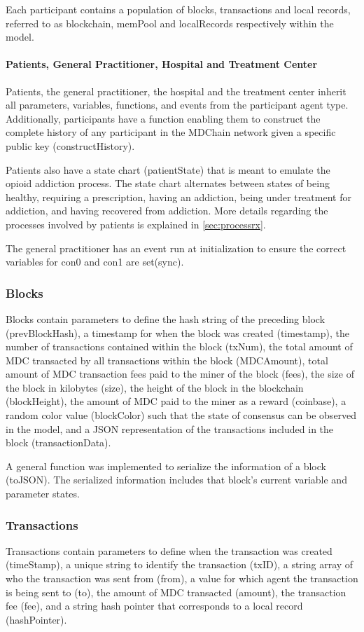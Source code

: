 \documentclass[12pt]{report}
\begin{document}
Each participant contains a population of blocks, transactions and local records, referred to as blockchain, memPool and localRecords respectively within the model.

\paragraph{Patients, General Practitioner, Hospital and Treatment Center}
Patients, the general practitioner, the hospital and the treatment center inherit all parameters, variables, functions, and events from the participant agent type. Additionally, participants have a function enabling them to construct the complete history of any participant in the MDChain network given a specific public key (constructHistory).

Patients also have a state chart (patientState) that is meant to emulate the opioid addiction process. The state chart alternates between states of being healthy, requiring a prescription, having an addiction, being under treatment for addiction, and having recovered from addiction. More details regarding the processes involved by patients is explained in \autoref{sec:processrx}.

The general practitioner has an event run at initialization to ensure the correct variables for con0 and con1 are set(sync).
\subsubsection{Blocks}
Blocks contain parameters to define the hash string of the preceding block (prevBlockHash), a timestamp for when the block was created (timestamp), the number of transactions contained within the block (txNum), the total amount of MDC transacted by all transactions within the block (MDCAmount), total amount of MDC transaction fees paid to the miner of the block (fees), the size of the block in kilobytes (size), the height of the block in the blockchain (blockHeight), the amount of MDC paid to the miner as a reward (coinbase), a random color value (blockColor) such that the state of consensus can be observed in the model, and a JSON representation of the transactions included in the block (transactionData). 

A general function was implemented to serialize the  information of a block (toJSON). The serialized information includes that block's current variable and parameter states.

\subsubsection{Transactions}
Transactions contain parameters to define when the transaction was created (timeStamp), a unique string to identify the transaction (txID), a string array of who the transaction was sent from (from), a value for which agent the transaction is being sent to (to), the amount of MDC transacted (amount), the transaction fee (fee), and a string hash pointer that corresponds to a local record (hashPointer).
\end{document}
